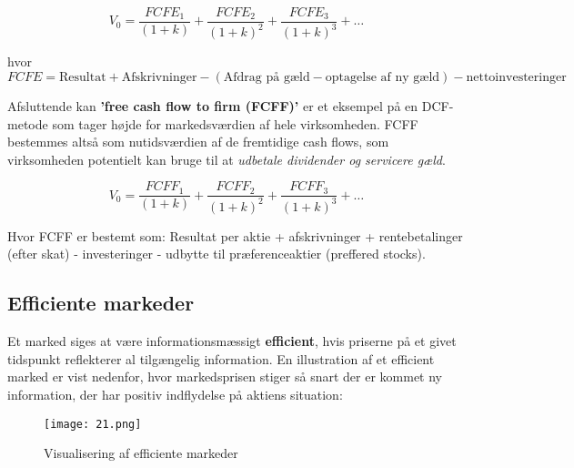 \documentclass[10pt,reqno, usenames]{article}
\begin{document}
\begin{equation}
    V_0 = \frac{FCFE_1}{(1 + k)} + \frac{FCFE_2}{(1 + k)^2} + \frac{FCFE_3}{(1 + k)^3} + \ldots
\end{equation}

hvor $FCFE = \text{Resultat} + \text{Afskrivninger} - (\text{Afdrag på gæld} - \text{optagelse af ny gæld}) -\text{nettoinvesteringer}$

\newpage

Afsluttende kan \textbf{'free cash flow to firm (FCFF)'} er et eksempel på en DCF-metode som tager højde for markedsværdien af hele virksomheden. FCFF bestemmes altså som nutidsværdien af de fremtidige cash flows, som virksomheden potentielt kan bruge til at \textit{udbetale dividender og servicere gæld}.

\begin{equation*}
        V_0 = \frac{FCFF_1}{(1 + k)} + \frac{FCFF_2}{(1 + k)^2} + \frac{FCFF_3}{(1 + k)^3} + \ldots
\end{equation*}

Hvor FCFF er bestemt som: Resultat per aktie + afskrivninger + rentebetalinger (efter skat) - investeringer - udbytte til præferenceaktier (preffered stocks).

\subsection{Efficiente markeder}
Et marked siges at være informationsmæssigt \textbf{efficient}, hvis
priserne på et givet tidspunkt reflekterer al tilgængelig information. En illustration af et efficient marked er vist nedenfor, hvor markedsprisen stiger så snart der er kommet ny information, der har positiv indflydelse på aktiens situation: 

\begin{figure}[h]
     \centering
     \texttt{[image: 21.png]}
     \caption{Visualisering af efficiente markeder}
     \label{Figur 2}
\end{figure} 
\end{document}
